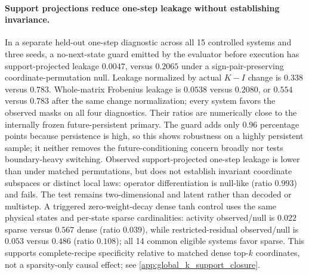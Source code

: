 \documentclass[11pt]{article}
\begin{document}
\paragraph{Support projections reduce one-step leakage without establishing invariance.}
In a separate held-out one-step diagnostic across all 15 controlled systems
and three seeds, a no-next-state guard emitted by the evaluator before
execution has support-projected leakage \(0.0047\), versus \(0.2065\) under a
sign-pair-preserving coordinate-permutation null. Leakage normalized by actual
\(K-I\) change is \(0.338\) versus \(0.783\). Whole-matrix Frobenius leakage
is \(0.0538\) versus \(0.2080\), or \(0.554\) versus \(0.783\) after the same
change normalization; every system favors the observed masks on all four
diagnostics. Their ratios are numerically close to the internally frozen
future-persistent primary. The guard adds only 0.96 percentage points because
persistence is high, so this shows robustness on a highly persistent sample;
it neither removes the future-conditioning concern broadly nor tests
boundary-heavy switching. Observed support-projected one-step leakage is lower than under
matched permutations, but does not establish invariant coordinate subspaces or distinct local laws:
operator differentiation is null-like (ratio \(0.993\)) and fails.
The test remains two-dimensional and latent rather than decoded or multistep.
A triggered zero-weight-decay dense tanh control uses the same physical states and per-state sparse cardinalities: activity observed/null is \(0.022\) sparse
versus \(0.567\) dense (ratio \(0.039\)), while restricted-residual observed/null
is \(0.053\) versus \(0.486\) (ratio \(0.108\)); all 14 common eligible systems
favor sparse. This supports complete-recipe
specificity relative to matched dense top-\(k\) coordinates, not a
sparsity-only causal effect; see \cref{app:global_k_support_closure}.
\end{document}

